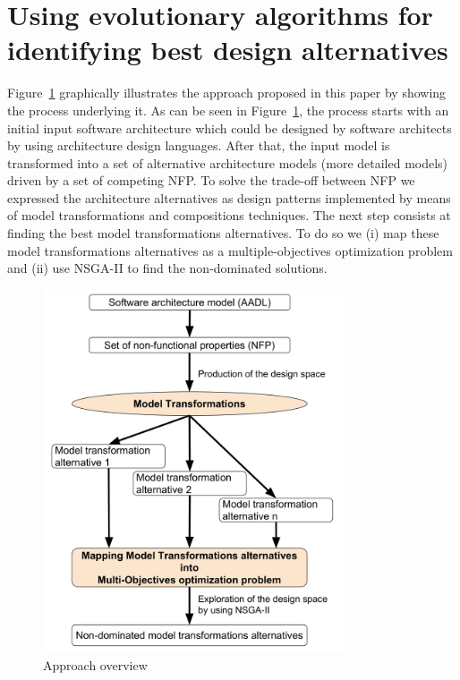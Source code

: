 \documentclass[conference]{IEEEtran}
\begin{document}
\section{Using evolutionary algorithms for identifying best design alternatives}
\label{Approach}
Figure~\ref{IS} graphically illustrates the approach proposed in this paper by showing the process underlying it. As can be seen in Figure~\ref{IS}, the process starts with an initial input software architecture which could be designed by software architects by using architecture design languages\cite{Medvidovic}. After that, the input model is transformed into a set of alternative architecture models (more detailed models) driven by a set of competing NFP. To solve the trade-off between NFP we expressed the architecture alternatives as design patterns implemented by means of model transformations and compositions techniques. The next step consists at finding the best model transformations alternatives. To do so we (i) map these model transformations alternatives as a multiple-objectives optimization problem and (ii) use NSGA-II to find the non-dominated solutions. 


\begin{figure}[!ht]
\centering
\includegraphics[width=3.49in]{IDMT.pdf}
\caption{Approach overview}
\label{IS}
\end{figure}
\end{document}
